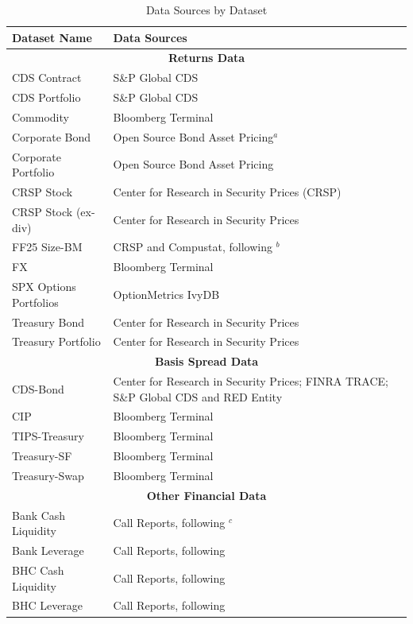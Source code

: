 \documentclass{article}
\begin{document}
\begin{table}[htbp]
\centering
\caption{Data Sources by Dataset}
\label{tab:data_sources}
\footnotesize
\begin{threeparttable}
\begin{tabular}{p{4cm}p{8cm}}
\toprule
Dataset Name & Data Sources \\ 
\midrule
\multicolumn{2}{c}{\textbf{Returns Data}} \\
\midrule
CDS Contract & S\&P Global CDS  \\
CDS Portfolio & S\&P Global CDS \\
Commodity & Bloomberg Terminal \\
Corporate Bond & Open Source Bond Asset Pricing$^{a}$  \\
Corporate Portfolio & Open Source Bond Asset Pricing \\
CRSP Stock & Center for Research in Security Prices (CRSP) \\
CRSP Stock (ex-div) & Center for Research in Security Prices \\
FF25 Size-BM & CRSP and Compustat, following \citet{Fama2023}$^{b}$ \\
FX & Bloomberg Terminal \\
SPX Options Portfolios & OptionMetrics IvyDB\\
Treasury Bond & Center for Research in Security Prices \\
Treasury Portfolio & Center for Research in Security Prices \\
\midrule
\multicolumn{2}{c}{\textbf{Basis Spread Data}} \\
\midrule
CDS-Bond & Center for Research in Security Prices; FINRA TRACE; S\&P Global CDS and RED Entity \\
CIP & Bloomberg Terminal \\
TIPS-Treasury & Bloomberg Terminal \\
Treasury-SF & Bloomberg Terminal \\
Treasury-Swap & Bloomberg Terminal \\
\midrule
\multicolumn{2}{c}{\textbf{Other Financial Data}} \\
\midrule
Bank Cash Liquidity & Call Reports, following \citet{Drechsler2017}$^{c}$ \\
Bank Leverage & Call Reports, following \citet{Drechsler2017} \\
BHC Cash Liquidity & Call Reports, following \citet{Drechsler2017} \\
BHC Leverage & Call Reports, following \citet{Drechsler2017} \\

\end{tabular}
\end{threeparttable}
\end{table}
\end{document}
